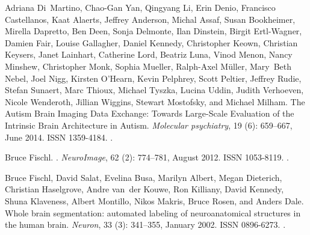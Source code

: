 \documentclass{midl}
\begin{document}
\begin{thebibliography}{50}
Adriana Di~Martino, Chao-Gan Yan, Qingyang Li, Erin Denio, Francisco
  Castellanos, Kaat Alaerts, Jeffrey Anderson, Michal Assaf, Susan Bookheimer,
  Mirella Dapretto, Ben Deen, Sonja Delmonte, Ilan Dinstein, Birgit
  Ertl-Wagner, Damien Fair, Louise Gallagher, Daniel Kennedy, Christopher
  Keown, Christian Keysers, Janet Lainhart, Catherine Lord, Beatriz Luna, Vinod
  Menon, Nancy Minshew, Christopher Monk, Sophia Mueller, Ralph-Axel Müller,
  Mary~Beth Nebel, Joel Nigg, Kirsten O’Hearn, Kevin Pelphrey, Scott Peltier,
  Jeffrey Rudie, Stefan Sunaert, Marc Thioux, Michael Tyszka, Lucina Uddin,
  Judith Verhoeven, Nicole Wenderoth, Jillian Wiggins, Stewart Mostofsky, and
  Michael Milham.
\newblock The {Autism} {Brain} {Imaging} {Data} {Exchange}: {Towards}
  {Large}-{Scale} {Evaluation} of the {Intrinsic} {Brain} {Architecture} in
  {Autism}.
\newblock \emph{Molecular psychiatry}, 19 (6): 659--667, June
  2014.
\newblock ISSN 1359-4184.
\newblock {}.

Bruce Fischl.
.
\newblock \emph{NeuroImage}, 62 (2): 774--781, August 2012.
\newblock ISSN 1053-8119.
\newblock {}.

Bruce Fischl, David Salat, Evelina Busa, Marilyn Albert, Megan Dieterich,
  Christian Haselgrove, Andre van~der Kouwe, Ron Killiany, David Kennedy, Shuna
  Klaveness, Albert Montillo, Nikos Makris, Bruce Rosen, and Anders Dale.
\newblock Whole brain segmentation: automated labeling of neuroanatomical
  structures in the human brain.
\newblock \emph{Neuron}, 33 (3): 341--355, January 2002.
\newblock ISSN 0896-6273.
\newblock {}.


\end{thebibliography}
\end{document}
